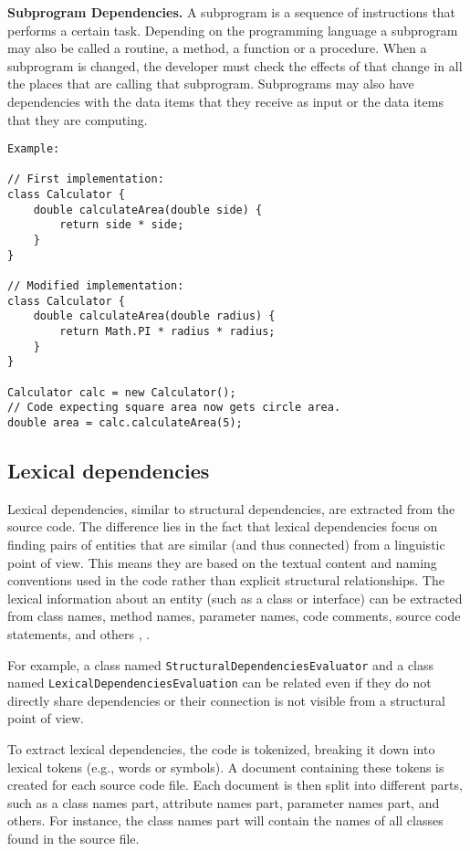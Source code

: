 \textbf{Subprogram Dependencies.}
A subprogram is a sequence of instructions that performs a certain task. Depending on the programming language a subprogram may also be called a routine, a method, a function or a procedure. When a subprogram is changed, the developer must check the effects of that change in all the places that are calling that subprogram. Subprograms may also have dependencies with the data items that they receive as input or the data items that they are computing.


\begin{verbatim}
Example:

// First implementation:
class Calculator {
    double calculateArea(double side) {
        return side * side;  
    }
}

// Modified implementation:
class Calculator {
    double calculateArea(double radius) {
        return Math.PI * radius * radius; 
    }
}

Calculator calc = new Calculator();
// Code expecting square area now gets circle area.
double area = calc.calculateArea(5);  

\end{verbatim}





\subsection{Lexical dependencies}

\hspace{4em}Lexical dependencies, similar to structural dependencies, are extracted from the source code. The difference lies in the fact that lexical dependencies focus on finding pairs of entities that are similar (and thus connected) from a linguistic point of view. This means they are based on the textual content and naming conventions used in the code rather than explicit structural relationships. The lexical information about an entity (such as a class or interface) can be extracted from class names, method names, parameter names, code comments, source code statements, and others \cite{lexical-dep}, \cite{lexical-dep-Prajapati}.

For example, a class named \texttt{StructuralDependenciesEvaluator} and a class named \texttt{LexicalDependenciesEvaluation} can be related even if they do not directly share dependencies or their connection is not visible from a structural point of view.

To extract lexical dependencies, the code is tokenized, breaking it down into lexical tokens (e.g., words or symbols). A document containing these tokens is created for each source code file. Each document is then split into different parts, such as a class names part, attribute names part, parameter names part, and others. For instance, the class names part will contain the names of all classes found in the source file.

